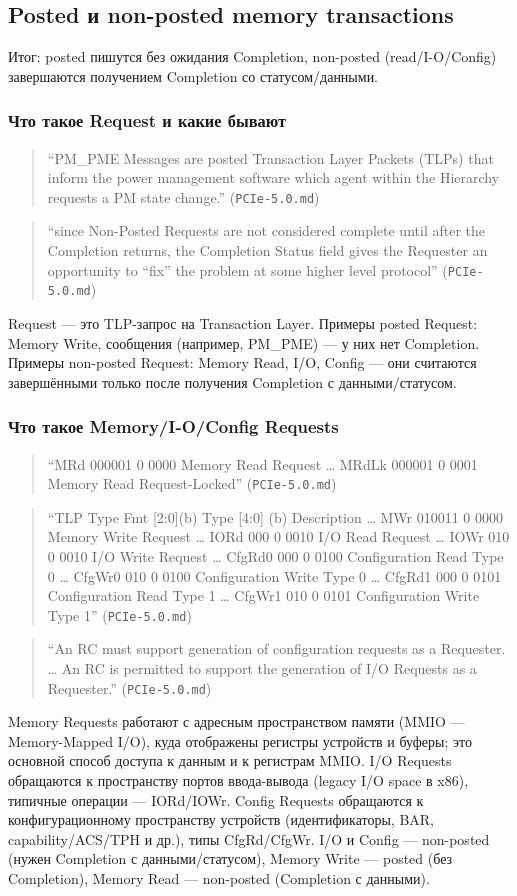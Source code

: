 \documentclass[a4paper,12pt]{article}
\begin{document}
\subsection{Posted и non-posted memory transactions}
Итог: posted пишутся без ожидания Completion, non-posted (read/I-O/Config) завершаются получением Completion со статусом/данными.
\subsubsection{Что такое Request и какие бывают}
\begin{quote}
``PM\_PME Messages are posted Transaction Layer Packets (TLPs) that inform the power management software which agent within the Hierarchy requests a PM state change.'' (\texttt{PCIe-5.0.md})
\end{quote}
\begin{quote}
``since Non-Posted Requests are not considered complete until after the Completion returns, the Completion Status field gives the Requester an opportunity to “fix” the problem at some higher level protocol'' (\texttt{PCIe-5.0.md})
\end{quote}
Request — это TLP-запрос на Transaction Layer. Примеры posted Request: Memory Write, сообщения (например, PM\_PME) — у них нет Completion. Примеры non-posted Request: Memory Read, I/O, Config — они считаются завершёнными только после получения Completion с данными/статусом.
\subsubsection{Что такое Memory/I-O/Config Requests}
\begin{quote}
``MRd 000001 0 0000 Memory Read Request … MRdLk 000001 0 0001 Memory Read Request-Locked'' (\texttt{PCIe-5.0.md})
\end{quote}
\begin{quote}
``TLP Type Fmt [2:0](b) Type [4:0] (b) Description … MWr 010011 0 0000 Memory Write Request … IORd 000 0 0010 I/O Read Request … IOWr 010 0 0010 I/O Write Request … CfgRd0 000 0 0100 Configuration Read Type 0 … CfgWr0 010 0 0100 Configuration Write Type 0 … CfgRd1 000 0 0101 Configuration Read Type 1 … CfgWr1 010 0 0101 Configuration Write Type 1'' (\texttt{PCIe-5.0.md})
\end{quote}
\begin{quote}
``An RC must support generation of configuration requests as a Requester. … An RC is permitted to support the generation of I/O Requests as a Requester.'' (\texttt{PCIe-5.0.md})
\end{quote}
Memory Requests работают с адресным пространством памяти (MMIO — Memory-Mapped I/O), куда отображены регистры устройств и буферы; это основной способ доступа к данным и к регистрам MMIO. I/O Requests обращаются к пространству портов ввода-вывода (legacy I/O space в x86), типичные операции — IORd/IOWr. Config Requests обращаются к конфигурационному пространству устройств (идентификаторы, BAR, capability/ACS/TPH и др.), типы CfgRd/CfgWr. I/O и Config — non-posted (нужен Completion с данными/статусом), Memory Write — posted (без Completion), Memory Read — non-posted (Completion с данными).
\end{document}
